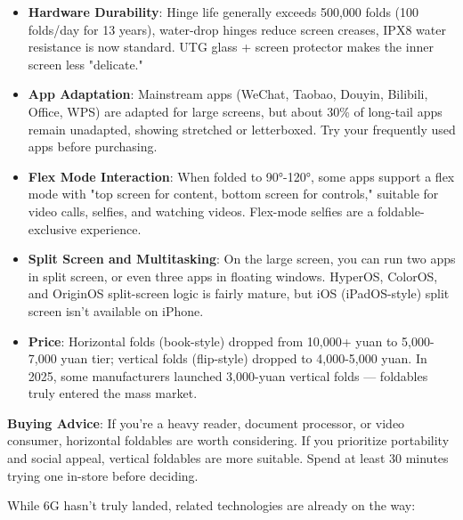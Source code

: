 \begin{itemize}
  \item \textbf{Hardware Durability}: Hinge life generally exceeds 500,000 folds (100 folds/day for 13 years), water-drop hinges reduce screen creases, IPX8 water resistance is now standard. UTG glass + screen protector makes the inner screen less "delicate."
  \item \textbf{App Adaptation}: Mainstream apps (WeChat, Taobao, Douyin, Bilibili, Office, WPS) are adapted for large screens, but about 30\% of long-tail apps remain unadapted, showing stretched or letterboxed. Try your frequently used apps before purchasing.
  \item \textbf{Flex Mode Interaction}: When folded to 90°-120°, some apps support a flex mode with "top screen for content, bottom screen for controls," suitable for video calls, selfies, and watching videos. Flex-mode selfies are a foldable-exclusive experience.
  \item \textbf{Split Screen and Multitasking}: On the large screen, you can run two apps in split screen, or even three apps in floating windows. HyperOS, ColorOS, and OriginOS split-screen logic is fairly mature, but iOS (iPadOS-style) split screen isn't available on iPhone.
  \item \textbf{Price}: Horizontal folds (book-style) dropped from 10,000+ yuan to 5,000-7,000 yuan tier; vertical folds (flip-style) dropped to 4,000-5,000 yuan. In 2025, some manufacturers launched 3,000-yuan vertical folds — foldables truly entered the mass market.
\end{itemize}

\textbf{Buying Advice}: If you're a heavy reader, document processor, or video consumer, horizontal foldables are worth considering. If you prioritize portability and social appeal, vertical foldables are more suitable. Spend at least 30 minutes trying one in-store before deciding.


While 6G hasn't truly landed, related technologies are already on the way:

